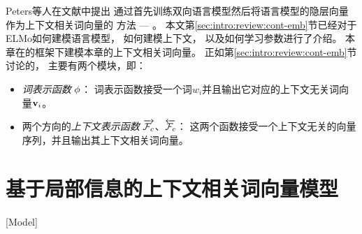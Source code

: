 Peters等人在文献中提出
通过首先训练双向语言模型然后将语言模型的隐层向量作为上下文相关词向量的
方法 --- \elmochinesetranslation。
本文第\ref{sec:intro:review:cont-emb}节已经对于ELMo如何建模语言模型，
如何建模上下文，
以及如何学习参数进行了介绍。
本章在\elmochinesetranslation 的框架下建模本章的上下文相关词向量。
正如第\ref{sec:intro:review:cont-emb}节讨论的，
\elmochinesetranslation 主要有两个模块，即：
\begin{itemize}
	\item \textit{词表示函数} $\phi$：
	词表示函数接受一个词$w_i$并且输出它对应的上下文无关词向量$\mathbf{v}_i$。
	\item 两个方向的\textit{上下文表示函数} $\overrightarrow{\mathcal{F}_{c}}$、$\overleftarrow{\mathcal{F}_{c}}$：
	这两个函数接受一个上下文无关的向量序列，并且输出其上下文相关词向量。
\end{itemize}

%
%

\section{基于局部信息的上下文相关词向量模型}[Model]\label{sec:elmo:model}


